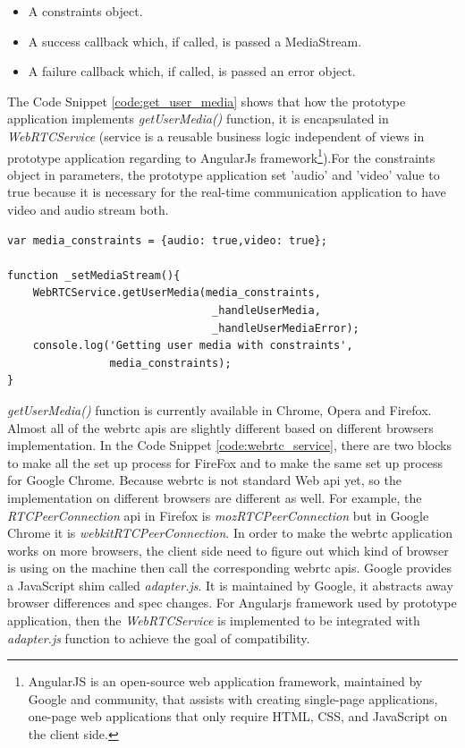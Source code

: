 \begin{itemize}[topsep=-1em,parsep=0em,itemsep=0em]
 \item A constraints object.
 \item A success callback which, if called, is passed a MediaStream.
 \item A failure callback which, if called, is passed an error object.
\end{itemize}

\par The Code Snippet \ref{code:get_user_media} shows that how the prototype application implements \textit{getUserMedia()} function, it is encapsulated in \textit{WebRTCService} (service is a reusable business logic independent of views in prototype application regarding to AngularJs framework\footnote{AngularJS is an open-source web application framework, maintained by Google and community, that assists with creating single-page applications, one-page web applications that only require HTML, CSS, and JavaScript on the client side.\cite{wiki:angularjs}}).For the constraints object in parameters, the prototype application set 'audio' and 'video' value to true because it is necessary for the real-time communication application to have video and audio stream both.

\begin{lstlisting}[caption={Get User Media Stream function},label={code:get_user_media}]
var media_constraints = {audio: true,video: true};

function _setMediaStream(){
	WebRTCService.getUserMedia(media_constraints,
  								_handleUserMedia,
  								_handleUserMediaError);
  	console.log('Getting user media with constraints', 
  				media_constraints);
}
\end{lstlisting}

\par \textit{getUserMedia()} function is currently available in Chrome, Opera and Firefox. Almost all of the \gls{webrtc} \gls{api}s are slightly different based on different browsers implementation. In the Code Snippet \ref{code:webrtc_service}, there are two blocks to make all the set up process for FireFox and to make the same set up process for Google Chrome. Because \gls{webrtc} is not standard Web \gls{api} yet, so the implementation on different browsers are different as well. For example, the \textit{RTCPeerConnection} \gls{api} in Firefox is \textit{mozRTCPeerConnection} but in Google Chrome it is \textit{webkitRTCPeerConnection}. In order to make the \gls{webrtc} application works on more browsers, the client side need to figure out which kind of browser is using on the machine then call the corresponding \gls{webrtc} \gls{api}s. Google provides a JavaScript shim called \textit{adapter.js}. It is maintained by Google, it abstracts away browser differences and spec changes. For Angularjs framework used by prototype application, then the \textit{WebRTCService} is implemented to be integrated with \textit{adapter.js} function to achieve the goal of compatibility.

